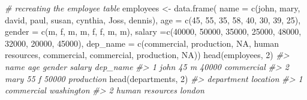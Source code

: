 \documentclass[
]{book}
\newenvironment{Shaded}{\begin{snugshade}}{\end{snugshade}}
\newcommand{\AttributeTok}[1]{\textcolor[rgb]{0.77,0.63,0.00}{#1}}
\newcommand{\CommentTok}[1]{\textcolor[rgb]{0.56,0.35,0.01}{\textit{#1}}}
\newcommand{\ConstantTok}[1]{\textcolor[rgb]{0.00,0.00,0.00}{#1}}
\newcommand{\DecValTok}[1]{\textcolor[rgb]{0.00,0.00,0.81}{#1}}
\newcommand{\FunctionTok}[1]{\textcolor[rgb]{0.00,0.00,0.00}{#1}}
\newcommand{\NormalTok}[1]{#1}
\newcommand{\OtherTok}[1]{\textcolor[rgb]{0.56,0.35,0.01}{#1}}
\newcommand{\StringTok}[1]{\textcolor[rgb]{0.31,0.60,0.02}{#1}}
\begin{document}
\begin{Shaded}
\begin{Highlighting}[]
\CommentTok{\# recreating the employee table}
\NormalTok{employees }\OtherTok{\textless{}{-}} \FunctionTok{data.frame}\NormalTok{(}
  \AttributeTok{name =} \FunctionTok{c}\NormalTok{(}\StringTok{\textquotesingle{}john\textquotesingle{}}\NormalTok{, }\StringTok{\textquotesingle{}mary\textquotesingle{}}\NormalTok{, }\StringTok{\textquotesingle{}david\textquotesingle{}}\NormalTok{, }\StringTok{\textquotesingle{}paul\textquotesingle{}}\NormalTok{, }\StringTok{\textquotesingle{}susan\textquotesingle{}}\NormalTok{, }\StringTok{\textquotesingle{}cynthia\textquotesingle{}}\NormalTok{, }\StringTok{\textquotesingle{}Joss\textquotesingle{}}\NormalTok{, }\StringTok{\textquotesingle{}dennis\textquotesingle{}}\NormalTok{),}
  \AttributeTok{age =} \FunctionTok{c}\NormalTok{(}\DecValTok{45}\NormalTok{, }\DecValTok{55}\NormalTok{, }\DecValTok{35}\NormalTok{, }\DecValTok{58}\NormalTok{, }\DecValTok{40}\NormalTok{, }\DecValTok{30}\NormalTok{, }\DecValTok{39}\NormalTok{, }\DecValTok{25}\NormalTok{),}
  \AttributeTok{gender =} \FunctionTok{c}\NormalTok{(}\StringTok{\textquotesingle{}m\textquotesingle{}}\NormalTok{, }\StringTok{\textquotesingle{}f\textquotesingle{}}\NormalTok{, }\StringTok{\textquotesingle{}m\textquotesingle{}}\NormalTok{, }\StringTok{\textquotesingle{}m\textquotesingle{}}\NormalTok{, }\StringTok{\textquotesingle{}f\textquotesingle{}}\NormalTok{, }\StringTok{\textquotesingle{}f\textquotesingle{}}\NormalTok{, }\StringTok{\textquotesingle{}m\textquotesingle{}}\NormalTok{, }\StringTok{\textquotesingle{}m\textquotesingle{}}\NormalTok{),}
  \AttributeTok{salary =}\FunctionTok{c}\NormalTok{(}\DecValTok{40000}\NormalTok{, }\DecValTok{50000}\NormalTok{, }\DecValTok{35000}\NormalTok{, }\DecValTok{25000}\NormalTok{, }\DecValTok{48000}\NormalTok{, }\DecValTok{32000}\NormalTok{, }\DecValTok{20000}\NormalTok{, }\DecValTok{45000}\NormalTok{),}
  \AttributeTok{dep\_name =} \FunctionTok{c}\NormalTok{(}\StringTok{\textquotesingle{}commercial\textquotesingle{}}\NormalTok{, }\StringTok{\textquotesingle{}production\textquotesingle{}}\NormalTok{, }\ConstantTok{NA}\NormalTok{, }\StringTok{\textquotesingle{}human resources\textquotesingle{}}\NormalTok{, }\StringTok{\textquotesingle{}commercial\textquotesingle{}}\NormalTok{, }
               \StringTok{\textquotesingle{}commercial\textquotesingle{}}\NormalTok{, }\StringTok{\textquotesingle{}production\textquotesingle{}}\NormalTok{, }\ConstantTok{NA}\NormalTok{))}
\FunctionTok{head}\NormalTok{(employees, }\DecValTok{2}\NormalTok{)}
\CommentTok{\#\textgreater{}   name age gender salary   dep\_name}
\CommentTok{\#\textgreater{} 1 john  45      m  40000 commercial}
\CommentTok{\#\textgreater{} 2 mary  55      f  50000 production}
\FunctionTok{head}\NormalTok{(departments, }\DecValTok{2}\NormalTok{)}
\CommentTok{\#\textgreater{}        department   location}
\CommentTok{\#\textgreater{} 1      commercial washington}
\CommentTok{\#\textgreater{} 2 human resources     london}


\end{Highlighting}
\end{Shaded}
\end{document}
